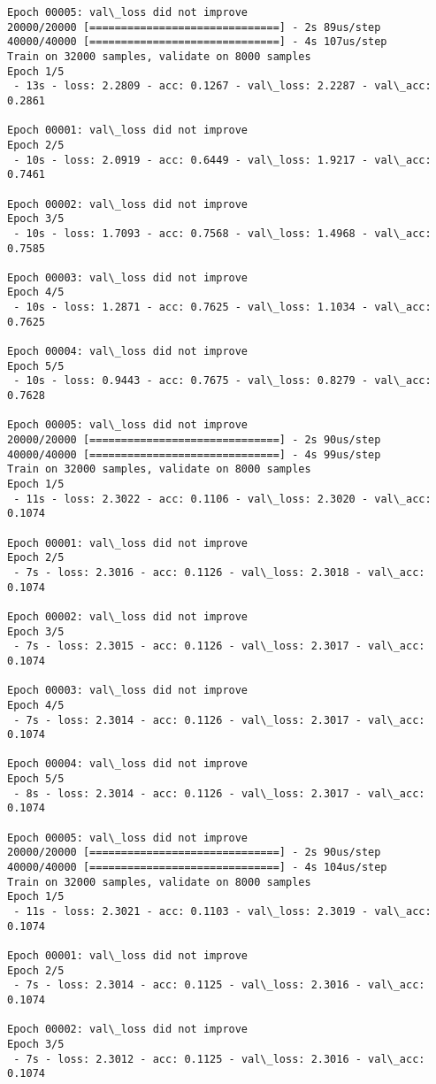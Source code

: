 \documentclass[11pt]{article}
\begin{document}
\begin{Verbatim}[commandchars=\\\{\}]
Epoch 00005: val\_loss did not improve
20000/20000 [==============================] - 2s 89us/step
40000/40000 [==============================] - 4s 107us/step
Train on 32000 samples, validate on 8000 samples
Epoch 1/5
 - 13s - loss: 2.2809 - acc: 0.1267 - val\_loss: 2.2287 - val\_acc: 0.2861

Epoch 00001: val\_loss did not improve
Epoch 2/5
 - 10s - loss: 2.0919 - acc: 0.6449 - val\_loss: 1.9217 - val\_acc: 0.7461

Epoch 00002: val\_loss did not improve
Epoch 3/5
 - 10s - loss: 1.7093 - acc: 0.7568 - val\_loss: 1.4968 - val\_acc: 0.7585

Epoch 00003: val\_loss did not improve
Epoch 4/5
 - 10s - loss: 1.2871 - acc: 0.7625 - val\_loss: 1.1034 - val\_acc: 0.7625

Epoch 00004: val\_loss did not improve
Epoch 5/5
 - 10s - loss: 0.9443 - acc: 0.7675 - val\_loss: 0.8279 - val\_acc: 0.7628

Epoch 00005: val\_loss did not improve
20000/20000 [==============================] - 2s 90us/step
40000/40000 [==============================] - 4s 99us/step
Train on 32000 samples, validate on 8000 samples
Epoch 1/5
 - 11s - loss: 2.3022 - acc: 0.1106 - val\_loss: 2.3020 - val\_acc: 0.1074

Epoch 00001: val\_loss did not improve
Epoch 2/5
 - 7s - loss: 2.3016 - acc: 0.1126 - val\_loss: 2.3018 - val\_acc: 0.1074

Epoch 00002: val\_loss did not improve
Epoch 3/5
 - 7s - loss: 2.3015 - acc: 0.1126 - val\_loss: 2.3017 - val\_acc: 0.1074

Epoch 00003: val\_loss did not improve
Epoch 4/5
 - 7s - loss: 2.3014 - acc: 0.1126 - val\_loss: 2.3017 - val\_acc: 0.1074

Epoch 00004: val\_loss did not improve
Epoch 5/5
 - 8s - loss: 2.3014 - acc: 0.1126 - val\_loss: 2.3017 - val\_acc: 0.1074

Epoch 00005: val\_loss did not improve
20000/20000 [==============================] - 2s 90us/step
40000/40000 [==============================] - 4s 104us/step
Train on 32000 samples, validate on 8000 samples
Epoch 1/5
 - 11s - loss: 2.3021 - acc: 0.1103 - val\_loss: 2.3019 - val\_acc: 0.1074

Epoch 00001: val\_loss did not improve
Epoch 2/5
 - 7s - loss: 2.3014 - acc: 0.1125 - val\_loss: 2.3016 - val\_acc: 0.1074

Epoch 00002: val\_loss did not improve
Epoch 3/5
 - 7s - loss: 2.3012 - acc: 0.1125 - val\_loss: 2.3016 - val\_acc: 0.1074


\end{Verbatim}
\end{document}
